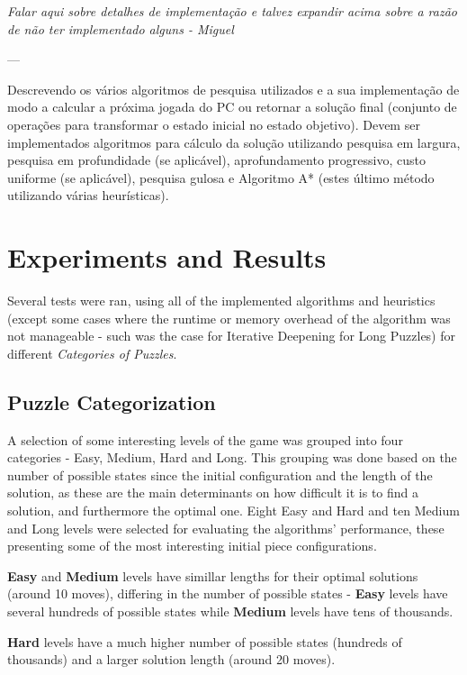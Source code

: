 \documentclass[conference]{IEEEtran}
\begin{document}
\begin{bf}
\textit{
Falar aqui sobre detalhes de implementação e talvez expandir acima sobre a razão de não ter implementado alguns - Miguel
}
\end{bf}

---

Descrevendo os vários algoritmos de pesquisa utilizados e a sua implementação de modo a calcular a próxima jogada do PC ou retornar a solução final (conjunto de operações para transformar o estado inicial no estado objetivo). Devem ser implementados algoritmos para cálculo da solução utilizando pesquisa em largura, pesquisa em profundidade (se aplicável), aprofundamento progressivo, custo uniforme (se aplicável), pesquisa gulosa e Algoritmo A* (estes último método utilizando várias heurísticas).

\section{Experiments and Results}
Several tests were ran, using all of the implemented algorithms and heuristics (except some cases where the runtime or memory overhead of the algorithm was not manageable - such was the case for Iterative Deepening for Long Puzzles) for different \textit{Categories of Puzzles}.

\subsection{Puzzle Categorization}

A selection of some interesting levels of the game was grouped into four categories - Easy, Medium, Hard and Long. This grouping was done based on the number of possible states since the initial configuration and the length of the solution, as these are the main determinants on how difficult it is to find a solution, and furthermore the optimal one. Eight Easy and Hard and ten Medium and Long levels were selected for evaluating the algorithms' performance, these presenting some of the most interesting initial piece configurations.

\textbf{Easy} and \textbf{Medium} levels have simillar lengths for their optimal solutions (around 10 moves), differing in the number of possible states - \textbf{Easy} levels have several hundreds of possible states while \textbf{Medium} levels have tens of thousands.

\textbf{Hard} levels have a much higher number of possible states (hundreds of thousands) and a larger solution length (around 20 moves).
\end{document}
